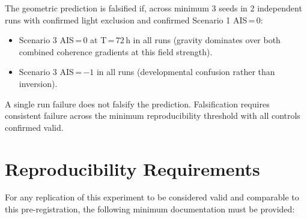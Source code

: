 \documentclass[10pt, a4paper]{article}
\begin{document}
The geometric prediction is falsified if, across
minimum 3 seeds in 2 independent runs with confirmed
light exclusion and confirmed Scenario 1 AIS\,=\,0:
\begin{itemize}[itemsep=0.1em]
  \item Scenario 3 AIS\,=\,0 at T\,=\,72\,h in all runs
    (gravity dominates over both combined coherence
    gradients at this field strength).
  \item Scenario 3 AIS\,=\,$-1$ in all runs
    (developmental confusion rather than inversion).
\end{itemize}

A single run failure does not falsify the prediction.
Falsification requires consistent failure across the
minimum reproducibility threshold with all controls
confirmed valid.

\vspace{0.5em}

\section{Reproducibility Requirements}

For any replication of this experiment to be considered
valid and comparable to this pre-registration, the
following minimum documentation must be provided:
\end{document}
